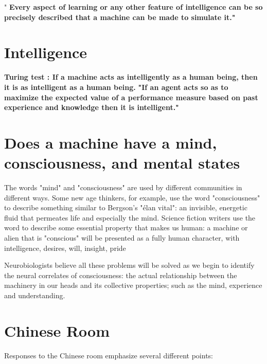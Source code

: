 \documentclass[a4paper,10pt]{article} %
\begin{document}
 "\textbf{ Every aspect of learning or any other feature of intelligence can be so precisely described that a machine can be made to simulate it."}
  
  
  \section{Intelligence}

     \textbf{Turing test : If a machine acts as intelligently as a human being, then it is as intelligent as a human being.}
       \textbf{"If an agent acts so as to maximize the expected value of a performance measure based on past experience and knowledge then it is intelligent."}
  
 
 
 
 \section{Does a machine have a mind, consciousness, and mental states}
 The words "mind" and "consciousness" are used by different communities in different ways. Some new age thinkers, for example, use the word "consciousness" to describe something similar to Bergson's "élan vital": an invisible, energetic fluid that permeates life and especially the mind. Science fiction writers use the word to describe some essential property that makes us human: a machine or alien that is "conscious" will be presented as a fully human character, with intelligence, desires, will, insight, pride
 
 Neurobiologists believe all these problems will be solved as we begin to identify the neural correlates of consciousness: the actual relationship between the machinery in our heads and its collective properties; such as the mind, experience and understanding. 

\section{Chinese Room}Responses to the Chinese room emphasize several different points:
\end{document}
